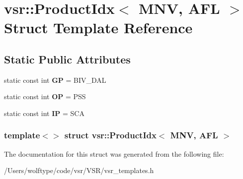 \hypertarget{structvsr_1_1_product_idx_3_01_m_n_v_00_01_a_f_l_01_4}{\section{vsr\-:\-:Product\-Idx$<$ M\-N\-V, A\-F\-L $>$ Struct Template Reference}
\label{structvsr_1_1_product_idx_3_01_m_n_v_00_01_a_f_l_01_4}
}
\subsection*{Static Public Attributes}
\begin{DoxyCompactItemize}
\item 
\hypertarget{structvsr_1_1_product_idx_3_01_m_n_v_00_01_a_f_l_01_4_aafb7e328d141dea019a66df7f0b16896}{static const int {\bfseries G\-P} = B\-I\-V\-\_\-\-D\-A\-L}\label{structvsr_1_1_product_idx_3_01_m_n_v_00_01_a_f_l_01_4_aafb7e328d141dea019a66df7f0b16896}

\item 
\hypertarget{structvsr_1_1_product_idx_3_01_m_n_v_00_01_a_f_l_01_4_a30fc30dfc748f4ce02e38b8d0df7ce63}{static const int {\bfseries O\-P} = P\-S\-S}\label{structvsr_1_1_product_idx_3_01_m_n_v_00_01_a_f_l_01_4_a30fc30dfc748f4ce02e38b8d0df7ce63}

\item 
\hypertarget{structvsr_1_1_product_idx_3_01_m_n_v_00_01_a_f_l_01_4_aeb7437e67d20be256858e63376799afe}{static const int {\bfseries I\-P} = S\-C\-A}\label{structvsr_1_1_product_idx_3_01_m_n_v_00_01_a_f_l_01_4_aeb7437e67d20be256858e63376799afe}

\end{DoxyCompactItemize}
\subsubsection*{template$<$$>$ struct vsr\-::\-Product\-Idx$<$ M\-N\-V, A\-F\-L $>$}



The documentation for this struct was generated from the following file\-:\begin{DoxyCompactItemize}
\item 
/\-Users/wolftype/code/vsr/\-V\-S\-R/vsr\-\_\-templates.\-h\end{DoxyCompactItemize}
